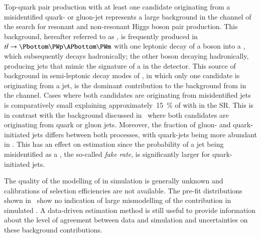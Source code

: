 

Top-quark pair production with at least one \tauhadvis candidate
originating from a misidentified quark- or gluon-jet represents a
large background in the \hadhad channel of the search for resonant and
non-resonant Higgs boson pair production. This background, hereafter
referred to as \ttbarFakes, is frequently produced in
$\ttbar \ra \Pbottom \PWp \APbottom \PWm$ with one leptonic decay of a
\PW boson into a \taulepton, which subsequently decays hadronically;
the other \PW boson decaying hadronically, producing jets that mimic
the signature of a \tauhadvis in the detector. This source of
\faketauhadvis background in semi-leptonic decay modes of \ttbar, in
which only one \tauhadvis candidate is originating from a jet, is the
dominant contribution to the \faketauhadvis background from \ttbar in
the \hadhad channel. Cases where both \tauhadvis candidates are
originating from misidentified jets is comparatively small explaining
approximately~\SI{15}{\percent} of \ttbar with \faketauhadvis in the
\hadhad SR. This is in contrast with the \multijet background
discussed in~ where both \tauhadvis
candidates are originating from quark or gluon jets. Moreover, the
fraction of gluon- and quark-initiated jets differs between both
processes, with quark-jets being more abundant in \ttbar. This has an
effect on \faketauhadvis estimation since the probability of a jet
being misidentified as a \tauhadvis, the so-called \emph{fake rate},
is significantly larger for quark-initiated jets.

The quality of the modelling of \faketauhadvis in simulation is
generally unknown and calibrations of \faketauhadvis selection
efficiencies are not available. The pre-fit distributions shown
in~ show no
indication of large mismodelling of the \faketauhadvis contribution in
simulated \ttbar. A data-driven estimation method is still useful to
provide information about the level of agreement between data and
simulation and uncertainties on these background contributions.

